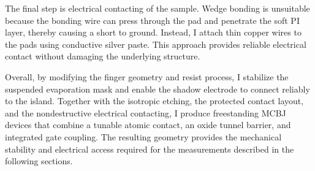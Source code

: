         The final step is electrical contacting of the sample. Wedge bonding is unsuitable because the bonding wire can press through the pad and penetrate the soft PI layer, thereby causing a short to ground. Instead, I attach thin copper wires to the pads using conductive silver paste. This approach provides reliable electrical contact without damaging the underlying structure.

        Overall, by modifying the finger geometry and resist process, I stabilize the suspended evaporation mask and enable the shadow electrode to connect reliably to the island. Together with the isotropic etching, the protected contact layout, and the nondestructive electrical contacting, I produce freestanding MCBJ devices that combine a tunable atomic contact, an oxide tunnel barrier, and integrated gate coupling. The resulting geometry provides the mechanical stability and electrical access required for the measurements described in the following sections.
